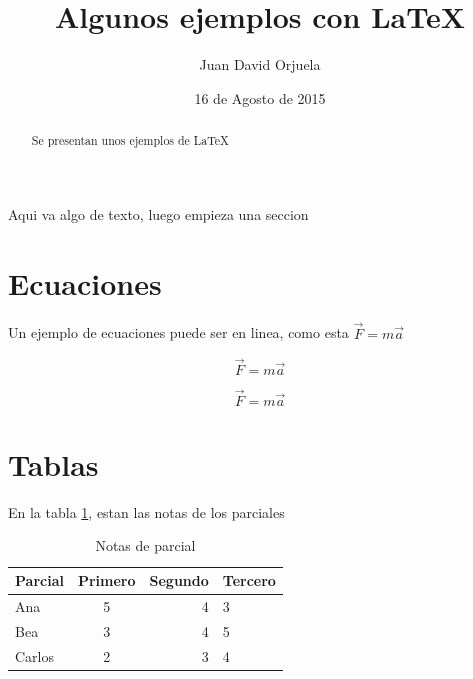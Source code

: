 \documentclass[12pt]{article}
\author{Juan David Orjuela}
\date{16 de Agosto de 2015}
\title{Algunos ejemplos con \LaTeX}
\begin{document}

\nocite{Alder1,anderson2008se}
\maketitle
\begin{abstract}
Se presentan unos ejemplos de \LaTeX
\end{abstract}

Aqui va algo de texto, luego empieza una seccion

\section{Ecuaciones}

Un ejemplo de ecuaciones puede ser en linea, como esta $ \vec{F} =m\vec{a} $

\begin{equation}
\vec{F}=m\vec{a}
\end{equation}

\begin{equation*}
\vec{F}=m\vec{a}
\end{equation*}

\section{Tablas}

En la tabla \ref{Ta:Notas}, estan las notas de los parciales
\begin{table}[ht]
\centering
\begin{tabular}{| l | c | r | l |}
\hline
Parcial & 
Primero & 
Segundo & 
Tercero \\ \hline
Ana & 5 & 4 & 3 \\ \hline
Bea & 3 & 4 & 5 \\ \hline
Carlos & 2 & 3 & 4 \\ \hline
\end{tabular}
\caption{Notas de parcial}\label{Ta:Notas}
\end{table}
\end{document}
